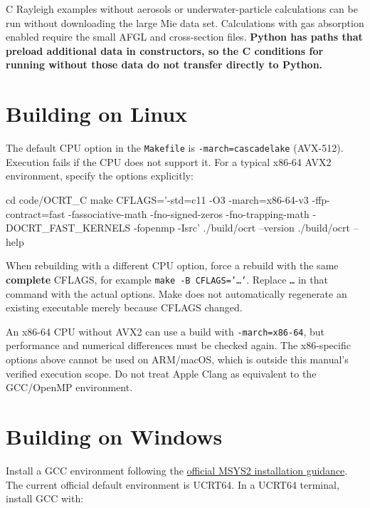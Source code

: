 C Rayleigh examples without aerosols or underwater-particle calculations can be run without downloading the large Mie data set. Calculations with gas absorption enabled require the small AFGL and cross-section files. \textbf{Python has paths that preload additional data in constructors, so the C conditions for running without those data do not transfer directly to Python.}

\section{Building on Linux}
\label{sec:auto:02_installation:3}
The default CPU option in the \texttt{Makefile} is \texttt{-\allowbreak{}march=\allowbreak{}cascadelake} (AVX-512). Execution fails if the CPU does not support it. For a typical x86-64 AVX2 environment, specify the options explicitly:


\par\noindent\begin{minipage}{\linewidth}
\begin{ManualCode}
cd code/OCRT_C
make CFLAGS='-std=c11 -O3 -march=x86-64-v3 -ffp-contract=fast -fassociative-math -fno-signed-zeros -fno-trapping-math -DOCRT_FAST_KERNELS -fopenmp -Isrc'
./build/ocrt --version
./build/ocrt --help
\end{ManualCode}
\end{minipage}\par

When rebuilding with a different CPU option, force a rebuild with the same \textbf{complete} CFLAGS, for example \texttt{make -\allowbreak{}B CFLAGS=\allowbreak{}'\ldots{}'}. Replace \texttt{\ldots{}} in that command with the actual options. Make does not automatically regenerate an existing executable merely because CFLAGS changed.

An x86-64 CPU without AVX2 can use a build with \texttt{-\allowbreak{}march=\allowbreak{}x86-\allowbreak{}64}, but performance and numerical differences must be checked again. The x86-specific options above cannot be used on ARM/macOS, which is outside this manual's verified execution scope. Do not treat Apple Clang as equivalent to the GCC/OpenMP environment.

\section{Building on Windows}
\label{sec:auto:02_installation:4}
Install a GCC environment following the \href{https://www.msys2.org/}{official MSYS2 installation guidance}. The current official default environment is UCRT64. In a UCRT64 terminal, install GCC with:


